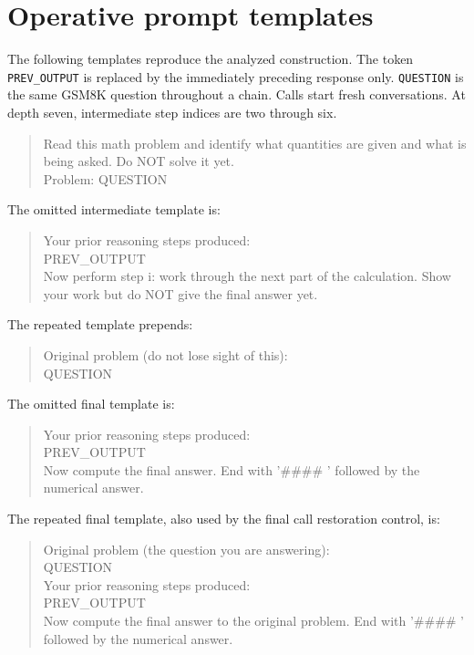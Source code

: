 \documentclass{article}
\begin{document}
\section{Operative prompt templates}
\label{app:prompts}
The following templates reproduce the analyzed construction. The token \texttt{PREV\_OUTPUT} is replaced by the immediately preceding response only. \texttt{QUESTION} is the same GSM8K question throughout a chain. Calls start fresh conversations. At depth seven, intermediate step indices are two through six.
\begin{quote}\small\ttfamily
Read this math problem and identify what quantities are given and what is being asked. Do NOT solve it yet.\\
Problem: QUESTION
\end{quote}
The omitted intermediate template is:
\begin{quote}\small\ttfamily
Your prior reasoning steps produced:\\
PREV\_OUTPUT\\
Now perform step i: work through the next part of the calculation. Show your work but do NOT give the final answer yet.
\end{quote}
The repeated template prepends:
\begin{quote}\small\ttfamily
Original problem (do not lose sight of this):\\
QUESTION
\end{quote}
\begin{samepage}
The omitted final template is:
\begin{quote}\small\ttfamily
Your prior reasoning steps produced:\\
PREV\_OUTPUT\\
Now compute the final answer. End with '\#\#\#\# ' followed by the numerical answer.
\end{quote}
\end{samepage}
The repeated final template, also used by the final call restoration control, is:
\begin{quote}\small\ttfamily
Original problem (the question you are answering):\\
QUESTION\\
Your prior reasoning steps produced:\\
PREV\_OUTPUT\\
Now compute the final answer to the original problem. End with '\#\#\#\# ' followed by the numerical answer.
\end{quote}
\end{document}
